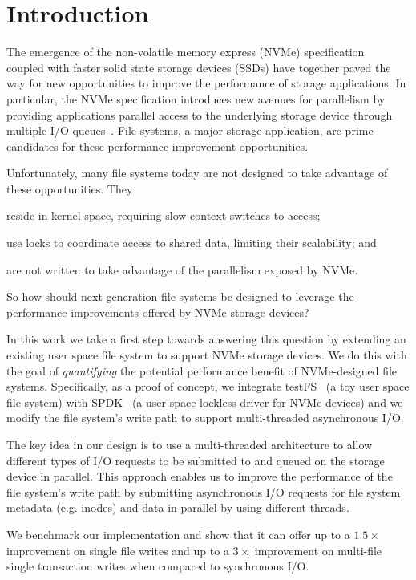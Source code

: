 \section{Introduction}
The emergence of the non-volatile memory express (NVMe)
specification~\cite{nvme} coupled with faster solid state storage devices
(SSDs) have together paved the way for new opportunities to improve the
performance of storage applications. In particular, the NVMe specification
introduces new avenues for parallelism by providing applications parallel
access to the underlying storage device through multiple I/O
queues~\cite{nvme}. File systems, a major storage application, are prime
candidates for these performance improvement opportunities.

Unfortunately, many file systems today are not designed to take advantage of
these opportunities. They
\begin{enumerate*}[label={(\roman*)}]
  \item reside in kernel space, requiring slow context switches to access;
  \item use locks to coordinate access to shared data, limiting their
    scalability; and
  \item are not written to take advantage of the parallelism exposed by NVMe.
\end{enumerate*}
So how should next generation file systems be designed to leverage the
performance improvements offered by NVMe storage devices?

In this work we take a first step towards answering this question by extending
an existing user space file system to support NVMe storage devices. We do this
with the goal of {\it quantifying} the potential performance benefit of
NVMe-designed file systems. Specifically, as a proof of concept, we integrate
testFS~\cite{testfs} (a toy user space file system) with SPDK~\cite{spdk} (a
user space lockless driver for NVMe devices) and we modify the file system's
write path to support multi-threaded asynchronous I/O.

The key idea in our design is to use a multi-threaded architecture to allow
different types of I/O requests to be submitted to and queued on the storage
device in parallel. This approach enables us to improve the performance of the
file system's write path by submitting asynchronous I/O requests for file
system metadata (e.g. inodes) and data in parallel by using different threads.

We benchmark our implementation and show that it can offer up to a $1.5\times$
improvement on single file writes and up to a $3\times$ improvement on
multi-file single transaction writes when compared to synchronous I/O.

